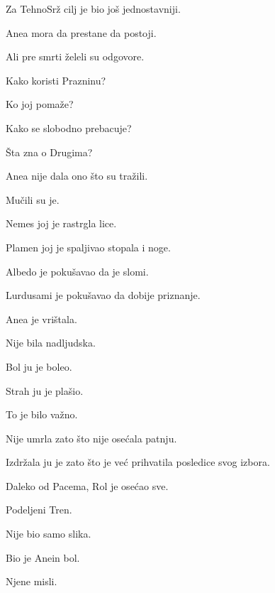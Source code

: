 Za TehnoSrž cilj je bio još jednostavniji.

\bigskip

Anea mora da prestane da postoji.

\bigskip

Ali pre smrti želeli su odgovore.

\bigskip

Kako koristi Prazninu?

Ko joj pomaže?

Kako se slobodno prebacuje?

Šta zna o Drugima?

\bigskip

Anea nije dala ono što su tražili.

\bigskip

Mučili su je.

\bigskip

Nemes joj je rastrgla lice.

\bigskip

Plamen joj je spaljivao stopala i noge.

\bigskip

Albedo je pokušavao da je slomi.

Lurdusami je pokušavao da dobije priznanje.

\bigskip

Anea je vrištala.

\bigskip

Nije bila nadljudska.

\bigskip

Bol ju je boleo.

Strah ju je plašio.

\bigskip

To je bilo važno.

\bigskip

Nije umrla zato što nije osećala patnju.

\bigskip

Izdržala ju je zato što je već prihvatila posledice svog izbora.

\bigskip

Daleko od Pacema, Rol je osećao sve.

\bigskip

Podeljeni Tren.

\bigskip

Nije bio samo slika.

\bigskip

Bio je Anein bol.

Njene misli.

